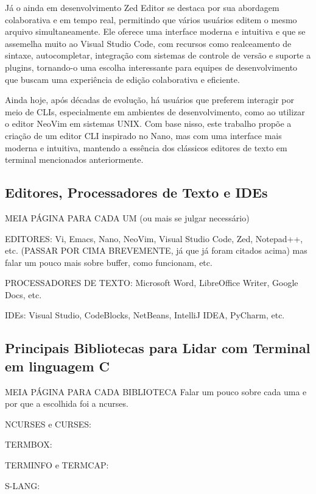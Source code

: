 Já o ainda em desenvolvimento Zed Editor se destaca por sua abordagem colaborativa e em tempo real, permitindo que vários usuários editem o mesmo
arquivo simultaneamente. Ele oferece uma interface moderna e intuitiva e que se assemelha muito ao Visual Studio Code, com recursos como realceamento de sintaxe,
autocompletar, integração com sistemas de controle de versão e suporte a plugins, tornando-o uma escolha interessante para equipes de desenvolvimento que buscam
uma experiência de edição colaborativa e eficiente.

Ainda hoje, após décadas de evolução, há usuários que preferem interagir por meio de CLIs, especialmente em ambientes de desenvolvimento, como ao utilizar o
editor NeoVim em sistemas UNIX. Com base nisso, este trabalho propõe a criação de um editor CLI inspirado no Nano, mas com uma interface mais moderna e
intuitiva, mantendo a essência dos clássicos editores de texto em terminal mencionados anteriormente.

\subsection{Editores, Processadores de Texto e IDEs}

MEIA PÁGINA PARA CADA UM (ou mais se julgar necessário)

EDITORES: Vi, Emacs, Nano, NeoVim, Visual Studio Code, Zed, Notepad++, etc. (PASSAR POR CIMA BREVEMENTE, já que já foram citados acima) mas falar um pouco mais
sobre buffer, como funcionam, etc.

PROCESSADORES DE TEXTO: Microsoft Word, LibreOffice Writer, Google Docs, etc.

IDEs: Visual Studio, CodeBlocks, NetBeans, IntelliJ IDEA, PyCharm, etc.

\subsection{Principais Bibliotecas para Lidar com Terminal em linguagem C}

MEIA PÁGINA PARA CADA BIBLIOTECA
Falar um pouco sobre cada uma e por que a escolhida foi a ncurses.

NCURSES e CURSES:

TERMBOX:

TERMINFO e TERMCAP:

S-LANG:

